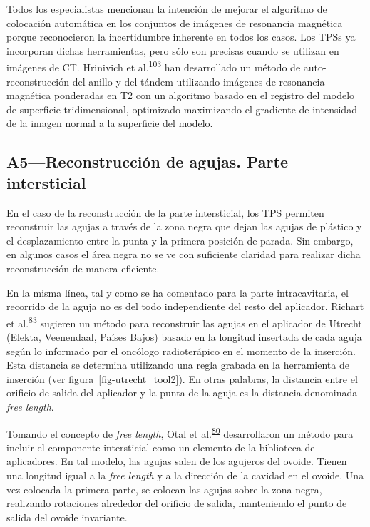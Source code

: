 \documentclass[
  a4paper,
]{scrreprt}
\begin{document}
Todos los especialistas mencionan la intención de mejorar el algoritmo
de colocación automática en los conjuntos de imágenes de resonancia
magnética porque reconocieron la incertidumbre inherente en todos los
casos. Los TPSs ya incorporan dichas herramientas, pero sólo son
precisas cuando se utilizan en imágenes de CT. Hrinivich et
al.\textsuperscript{\protect\hyperlink{ref-hrinivich2019}{103}} han
desarrollado un método de auto-reconstrucción del anillo y del tándem
utilizando imágenes de resonancia magnética ponderadas en T2 con un
algoritmo basado en el registro del modelo de superficie tridimensional,
optimizado maximizando el gradiente de intensidad de la imagen normal a
la superficie del modelo.

\hypertarget{sec-a5}{%
\subsection{A5---Reconstrucción de agujas. Parte
intersticial}\label{sec-a5}}

En el caso de la reconstrucción de la parte intersticial, los TPS
permiten reconstruir las agujas a través de la zona negra que dejan las
agujas de plástico y el desplazamiento entre la punta y la primera
posición de parada. Sin embargo, en algunos casos el área negra no se ve
con suficiente claridad para realizar dicha reconstrucción de manera
eficiente.

En la misma línea, tal y como se ha comentado para la parte
intracavitaria, el recorrido de la aguja no es del todo independiente
del resto del aplicador. Richart et
al.\textsuperscript{\protect\hyperlink{ref-richart2015}{83}} sugieren un
método para reconstruir las agujas en el aplicador de Utrecht (Elekta,
Veenendaal, Países Bajos) basado en la longitud insertada de cada aguja
según lo informado por el oncólogo radioterápico en el momento de la
inserción. Esta distancia se determina utilizando una regla grabada en
la herramienta de inserción (ver figura~\ref{fig-utrecht_tool2}). En
otras palabras, la distancia entre el orificio de salida del aplicador y
la punta de la aguja es la distancia denominada \emph{free length}.

Tomando el concepto de \emph{free length}, Otal et
al.\textsuperscript{\protect\hyperlink{ref-otal2017}{80}} desarrollaron
un método para incluir el componente intersticial como un elemento de la
biblioteca de aplicadores. En tal modelo, las agujas salen de los
agujeros del ovoide. Tienen una longitud igual a la \emph{free length} y
a la dirección de la cavidad en el ovoide. Una vez colocada la primera
parte, se colocan las agujas sobre la zona negra, realizando rotaciones
alrededor del orificio de salida, manteniendo el punto de salida del
ovoide invariante.
\end{document}
